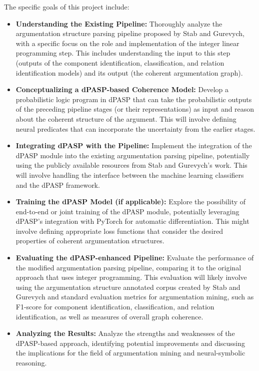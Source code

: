 \documentclass{article}
\begin{document}
The specific goals of this project include:

\begin{itemize}
    \item \textbf{Understanding the Existing Pipeline:} Thoroughly analyze the
    argumentation structure parsing pipeline proposed by Stab and Gurevych, with
     a specific focus on the role and implementation of the integer linear
     programming step. This includes understanding the input to this step
     (outputs of the component identification, classification, and relation
     identification models) and its output (the coherent argumentation graph).
    
    \item \textbf{Conceptualizing a dPASP-based Coherence Model:} Develop a
    probabilistic logic program in dPASP that can take the probabilistic outputs
     of the preceding pipeline stages (or their representations) as input and
     reason about the coherent structure of the argument. This will involve
     defining neural predicates that can incorporate the uncertainty from the
     earlier stages.
    
    \item \textbf{Integrating dPASP with the Pipeline:} Implement the
    integration of the dPASP module into the existing argumentation parsing
    pipeline, potentially using the publicly available resources from Stab and
    Gurevych's work. This will involve handling the interface between the
    machine learning classifiers and the dPASP framework.
    
    \item \textbf{Training the dPASP Model (if applicable):} Explore the
    possibility of end-to-end or joint training of the dPASP module, potentially
     leveraging dPASP's integration with PyTorch for automatic differentiation.
     This might involve defining appropriate loss functions that consider the
     desired properties of coherent argumentation structures.
    
    \item \textbf{Evaluating the dPASP-enhanced Pipeline:} Evaluate the
    performance of the modified argumentation parsing pipeline, comparing it to
    the original approach that uses integer programming. This evaluation will
    likely involve using the argumentation structure annotated corpus created
    by Stab and Gurevych and standard evaluation metrics for argumentation
    mining, such as F1-score for component identification, classification, and
    relation identification, as well as measures of overall graph coherence.
    
    \item \textbf{Analyzing the Results:} Analyze the strengths and weaknesses
    of the dPASP-based approach, identifying potential improvements and
    discussing the implications for the field of argumentation mining and
    neural-symbolic reasoning.
\end{itemize}
\end{document}
